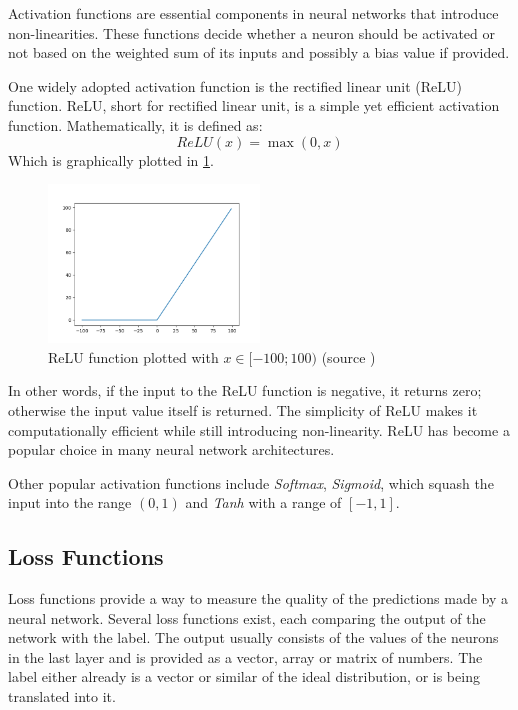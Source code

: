 \documentclass[12pt, a4paper, titlepage]{report}
\begin{document}
Activation functions are essential components in neural networks that introduce non-linearities. These functions decide whether a neuron should be activated or not based on the weighted sum of its inputs and possibly a bias value if provided.

One widely adopted activation function is the rectified linear unit (ReLU) function.
ReLU, short for rectified linear unit, is a simple yet efficient activation function. Mathematically, it is defined as:
\[ ReLU(x) = \max(0, x) \]
Which is graphically plotted in \ref{fig:relu_function}.

\begin{figure}[h]
   \centering
   \includegraphics[width=0.5\textwidth]{../rc/images/graph_relu_function.png}
   \caption{ReLU function plotted with $x \in {[-100; 100)}$ (source \cite{graph_relu_function})}
   \label{fig:relu_function}
\end{figure}

In other words, if the input to the ReLU function is negative, it returns zero; otherwise the input value itself is returned. The simplicity of ReLU makes it computationally efficient while still introducing non-linearity. ReLU has become a popular choice in many neural network architectures.

\vspace{0.5cm}
Other popular activation functions include \emph{Softmax}, \emph{Sigmoid}, which squash the input into the range $(0, 1)$ and \emph{Tanh} with a range of $[-1, 1]$.


\subsection{Loss Functions}

Loss functions provide a way to measure the quality of the predictions made by a neural network. Several loss functions exist, each comparing the output of the network with the label. The output usually consists of the values of the neurons in the last layer and is provided as a vector, array or matrix of numbers. The label either already is a vector or similar of the ideal distribution, or is being translated into it.
\end{document}
